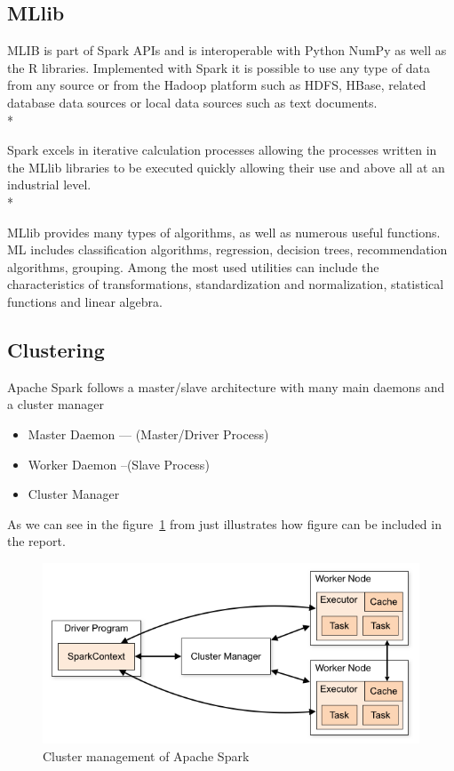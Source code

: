 \subsection{MLlib}

MLIB is part of Spark APIs and is interoperable with Python NumPy as well as the R libraries. Implemented with Spark it is possible to use any type of data from any source or from the Hadoop platform such as HDFS, HBase, related database data sources or local data sources such as text documents.\\*

Spark excels in iterative calculation processes allowing the processes written in the MLlib libraries to be executed quickly allowing their use and above all at an industrial level.\\*

MLlib provides many types of algorithms, as well as numerous useful functions. ML includes classification algorithms, regression, decision trees, recommendation algorithms, grouping. Among the most used utilities can include the characteristics of transformations, standardization and normalization, statistical functions and linear algebra.

\subsection{Clustering}

Apache Spark follows a master/slave architecture with many main daemons and a cluster manager
\begin{itemize}

	\item Master Daemon — (Master/Driver Process)
	\item Worker Daemon –(Slave Process)
	\item Cluster Manager
\end{itemize}

As we can see in the figure~\ref{fig:clusters-spark} from \cite{brown:96} just
illustrates how figure can be included in the report.


\begin{figure}[h]
	\centering
	\includegraphics[scale=0.5]{figs/cluster-overview.png}
	\caption{Cluster management of Apache Spark}
	\label{fig:clusters-spark}
\end{figure}

